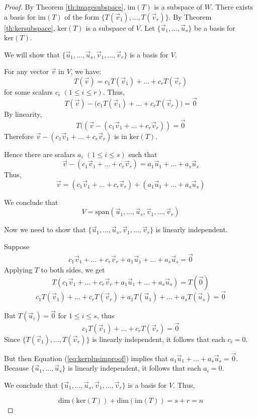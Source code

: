 \documentclass{ximera}
\begin{document}
\begin{proof}
By Theorem \ref{th:imagesubspace}, $\mbox{im}(T)$ is a subspace of $W$.  There exists a basis for $\mbox{im}(T)$ of the form $\{T(\vec{v}_1), \ldots,T(\vec{v}_r)\}$.  By Theorem \ref{th:kersubspace}, $\mbox{ker}(T)$ is a subspace of $V$.  Let $\{\vec{u}_1,\ldots,\vec{u}_s\}$ be a basis for $\mbox{ker}(T)$. 

We will show that $\{\vec{u}_1,\ldots ,\vec{u}_s, \vec{v}_1,\ldots ,\vec{v}_r\}$ is a basis for $V$.

For any vector $\vec{v}$ in $V$, we have:
$$T(\vec{v})=c_1T(\vec{v}_1)+\ldots +c_rT(\vec{v}_r)$$
for some scalars $c_i$ $(1\leq i\leq r)$.
Thus, 
$$T(\vec{v})-\big(c_1T(\vec{v}_1)+\ldots +c_rT(\vec{v}_r)\big)=\vec{0}$$
By linearity,
$$T((\vec{v}-(c_1\vec{v}_1+\ldots +c_r\vec{v}_r))=\vec{0}$$
Therefore $\vec{v}-(c_1\vec{v}_1+\ldots +c_r\vec{v}_r)$ is in $\mbox{ker}(T)$.

Hence there are scalars $a_i$ $(1\leq i\leq s)$ such that
$$\vec{v}-(c_1\vec{v}_1+\ldots +c_r\vec{v}_r)=a_1\vec{u}_1+\ldots +a_s\vec{u}_s$$
Thus,
$$\vec{v}=(c_1\vec{v}_1+\ldots +c_r\vec{v}_r)+(a_1\vec{u}_1+\ldots +a_s\vec{u}_s)$$

We conclude that 
$$V=\mbox{span}(\vec{u}_1,\ldots ,\vec{u}_s, \vec{v}_1,\ldots ,\vec{v}_r)$$

Now we need to show that $\{\vec{u}_1,\ldots ,\vec{u}_s, \vec{v}_1,\ldots ,\vec{v}_r\}$ is linearly independent.

Suppose 
\begin{align}\label{eq:kerplusimproof} c_1\vec{v}_1+\ldots +c_r\vec{v}_r+a_1\vec{u}_1+\ldots +a_s\vec{u}_s=\vec{0}\end{align}
Applying $T$ to both sides, we get
$$T(c_1\vec{v}_1+\ldots +c_r\vec{v}_r+a_1\vec{u}_1+\ldots +a_s\vec{u}_s)=T(\vec{0})$$
$$c_1T(\vec{v}_1)+\ldots +c_rT(\vec{v}_r)+a_1T(\vec{u}_1)+\ldots +a_sT(\vec{u}_s)=\vec{0}$$

But $T(\vec{u}_i)=\vec{0}$ for $1\leq i\leq s$, thus
$$c_1T(\vec{v}_1)+\ldots +c_rT(\vec{v}_r)=\vec{0}$$
Since $\{T(\vec{v}_1),\ldots ,T(\vec{v}_r)\}$ is linearly independent, it follows that each $c_i=0$.  

But then Equation (\ref{eq:kerplusimproof}) implies that $a_1\vec{u}_1+\ldots +a_s\vec{u}_s=\vec{0}$.  Because $\{\vec{u}_1, \ldots ,\vec{u}_s\}$ is linearly independent, it follows that each $a_i=0$.  

We conclude that $\{\vec{u}_1,\ldots ,\vec{u}_s,\vec{v}_1,\ldots ,\vec{v}_r\}$ is a basis for $V$.  Thus,

$$\mbox{dim}(\mbox{ker}(T))+\mbox{dim}(\mbox{im}(T))=s+r=n$$
\end{proof}
\end{document}
